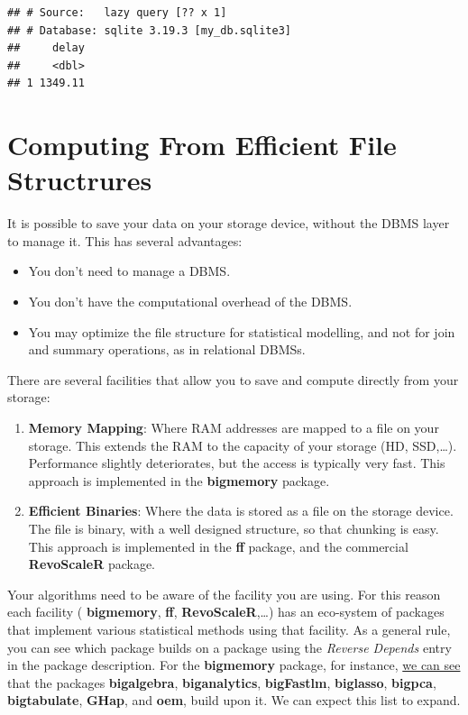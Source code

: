 \documentclass[]{book}
\providecommand{\tightlist}{%
  \setlength{\itemsep}{0pt}\setlength{\parskip}{0pt}}
\theoremstyle{definition}
\theoremstyle{definition}
\theoremstyle{definition}
\theoremstyle{remark}
\begin{document}
\begin{verbatim}
## # Source:   lazy query [?? x 1]
## # Database: sqlite 3.19.3 [my_db.sqlite3]
##     delay
##     <dbl>
## 1 1349.11
\end{verbatim}

\section{Computing From Efficient File
Structrures}\label{file-structure}

It is possible to save your data on your storage device, without the
DBMS layer to manage it. This has several advantages:

\begin{itemize}
\tightlist
\item
  You don't need to manage a DBMS.
\item
  You don't have the computational overhead of the DBMS.
\item
  You may optimize the file structure for statistical modelling, and not
  for join and summary operations, as in relational DBMSs.
\end{itemize}

There are several facilities that allow you to save and compute directly
from your storage:

\begin{enumerate}
\def\labelenumi{\arabic{enumi}.}
\item
  \textbf{Memory Mapping}: Where RAM addresses are mapped to a file on
  your storage. This extends the RAM to the capacity of your storage
  (HD, SSD,\ldots{}). Performance slightly deteriorates, but the access
  is typically very fast. This approach is implemented in the
  \textbf{bigmemory} package.
\item
  \textbf{Efficient Binaries}: Where the data is stored as a file on the
  storage device. The file is binary, with a well designed structure, so
  that chunking is easy. This approach is implemented in the \textbf{ff}
  package, and the commercial \textbf{RevoScaleR} package.
\end{enumerate}

Your algorithms need to be aware of the facility you are using. For this
reason each facility ( \textbf{bigmemory}, \textbf{ff},
\textbf{RevoScaleR},\ldots{}) has an eco-system of packages that
implement various statistical methods using that facility. As a general
rule, you can see which package builds on a package using the
\emph{Reverse Depends} entry in the package description. For the
\textbf{bigmemory} package, for instance,
\href{https://cran.r-project.org/web/packages/bigmemory/index.html}{we
can see} that the packages \textbf{bigalgebra}, \textbf{biganalytics},
\textbf{bigFastlm}, \textbf{biglasso}, \textbf{bigpca},
\textbf{bigtabulate}, \textbf{GHap}, and \textbf{oem}, build upon it. We
can expect this list to expand.
\end{document}
